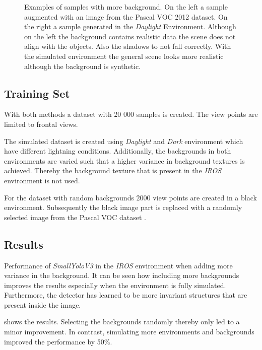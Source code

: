 \begin{figure}[hbtp]
\begin{minipage}{0.3\textwidth}
	\end{minipage}
	\caption{Examples of samples with more background. On the left a sample augmented with an image from the Pascal VOC 2012 dataset. On the right a sample generated in the \textit{Daylight} Environment. Although on the left the background contains realistic data the scene does not align with the objects. Also the shadows to not fall correctly. With the simulated environment the general scene looks more realistic although the background is synthetic.}
	\label{fig:sim_vs_voc}
\end{figure}

\subsection{Training Set}

With both methods a dataset with 20 000 samples is created. The view points are limited to frontal views.

The simulated dataset is created using \textit{Daylight} and \textit{Dark} environment which have different lightning conditions. Additionally, the backgrounds in both environments are varied such that a higher variance in background textures is achieved. Thereby the background texture that is present in the \textit{IROS} environment is not used.

For the dataset with random backgrounds 2000 view points are created in a black environment. Subsequently the black image part is replaced with a randomly selected image from the Pascal VOC dataset .

\subsection{Results}

\begin{table}
	\centering
	
	\caption{Performance of \textit{SmallYoloV3} in the \textit{IROS} environment when adding more variance in the background. It can be seen how including more backgrounds improves the results especially when the environment is fully simulated. Furthermore, the detector has learned to be more invariant structures that are present inside the image.}
	\label{tab:sim_vs_voc}
\end{table}

 shows the results. Selecting the backgrounds randomly thereby only led to a minor improvement. In contrast, simulating more environments and backgrounds improved the performance by 50\%.

